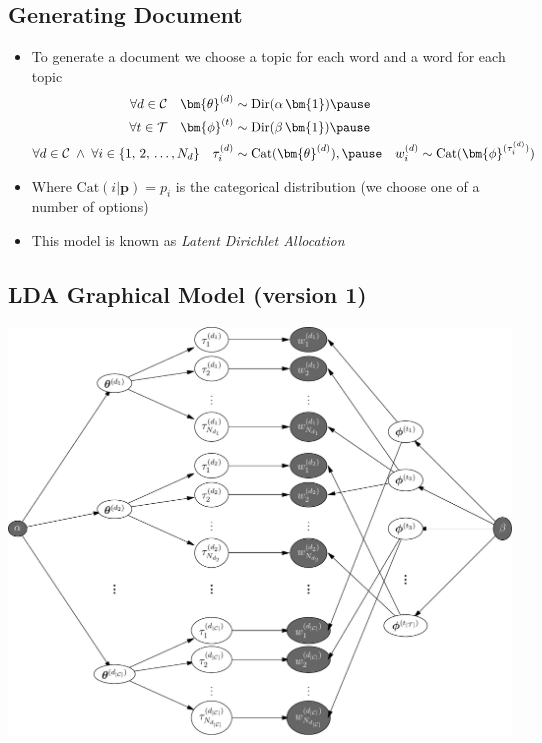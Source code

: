 
\begin{slide}
\section[-1]{Generating Document}

\begin{PauseHighLight}
  \begin{itemize}
  \item To generate a document we choose a topic for each word and a
    word for each topic\pause
    \begin{align*}
    \forall d\in\mathcal{C} \quad \bm{\theta}^{(d)}&\sim
    \mathrm{Dir}(\alpha\,\bm{1})\pause &&\\
    \forall t\in\mathcal{T} \quad \bm{\phi}^{(t)}&\sim
    \mathrm{Dir}(\beta\,\bm{1})\pause && \\
    \forall d\in\mathcal{C} \; \wedge\; \forall i\in\{1,\,2,\,\ldots, N_d\}
    \quad \tau^{(d)}_i &\sim \mathrm{Cat}(\bm{\theta}^{(d)}),\pause &
    w^{(d)}_i &\sim \mathrm{Cat}(\bm{\phi}^{(\tau^{(d)}_i)})
  \end{align*}
\item Where $\mathrm{Cat}(i|\bm{p}) = p_i$ is the categorical
  distribution (we choose one of a number of options)\pause
\item This model is known as \emph{Latent Dirichlet Allocation}\pause
  \end{itemize}
\end{PauseHighLight}

\end{slide}



\begin{slide}
\section[-2]{LDA Graphical Model (version 1)}

\begin{center}
  \includegraphics[width=0.8\linewidth]{LDAGM}
\end{center}
\end{slide}

